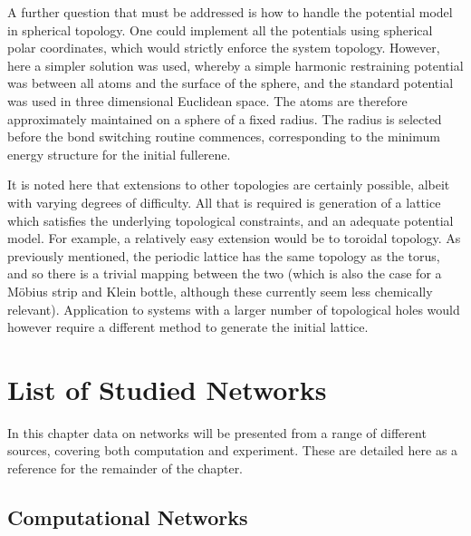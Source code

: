 A further question that must be addressed is how to handle the potential model in spherical topology. 
One could implement all the potentials using spherical polar coordinates, which would strictly enforce the system topology.
However, here a simpler solution was used, whereby a simple harmonic restraining potential was between all atoms and the surface of the sphere, and the standard potential was used in three dimensional Euclidean space.
The atoms are therefore approximately maintained on a sphere of a fixed radius.
The radius is selected before the bond switching routine commences, corresponding to the minimum energy structure for the initial fullerene.

It is noted here that extensions to other topologies are certainly possible, albeit with varying degrees of difficulty.
All that is required is generation of a lattice which satisfies the underlying topological constraints, and an adequate potential model.
For example, a relatively easy extension would be to toroidal topology.
As previously mentioned, the periodic \td{} lattice has the same topology as the torus, and so there is a trivial mapping between the two (which is also the case for a M\"obius strip and Klein bottle, although these currently seem less chemically relevant).
Application to systems with a larger number of topological holes would however require a different method to generate the initial lattice. 

\section{List of Studied Networks}

In this chapter data on networks will be presented from a range of different sources, covering both computation and experiment.
These are detailed here as a reference for the remainder of the chapter.

\subsection{Computational Networks}

